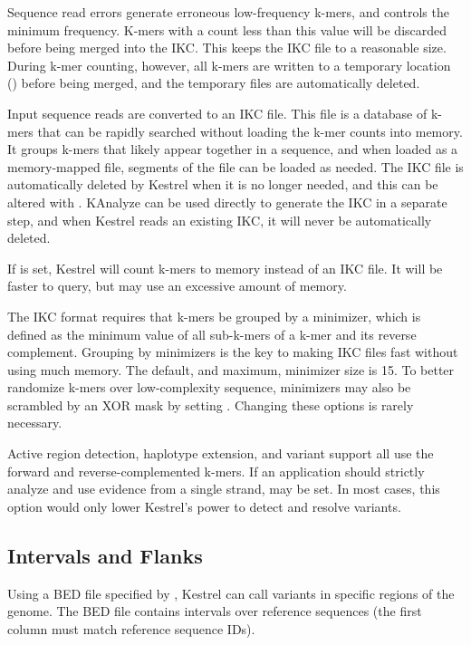 Sequence read errors generate erroneous low-frequency k-mers, and  controls the minimum frequency. K-mers with a count less than this value will be discarded before being merged into the IKC. This keeps the IKC file to a reasonable size. During k-mer counting, however, all k-mers are written to a temporary location () before being merged, and the temporary files are automatically deleted.

Input sequence reads are converted to an IKC file. This file is a database of k-mers that can be rapidly searched without loading the k-mer counts into memory. It groups k-mers that likely appear together in a sequence, and when loaded as a memory-mapped file, segments of the file can be loaded as needed. The IKC file is automatically deleted by Kestrel when it is no longer needed, and this can be altered with . KAnalyze can be used directly to generate the IKC in a separate step, and when Kestrel reads an existing IKC, it will never be automatically deleted.

If  is set, Kestrel will count k-mers to memory instead of an IKC file. It will be faster to query, but may use an excessive amount of memory.

The IKC format requires that k-mers be grouped by a minimizer, which is defined as the minimum value of all sub-k-mers of a k-mer and its reverse complement. Grouping by minimizers is the key to making IKC files fast without using much memory. The default, and maximum, minimizer size is 15. To better randomize k-mers over low-complexity sequence, minimizers may also be scrambled by an XOR mask by setting . Changing these options is rarely necessary.

Active region detection, haplotype extension, and variant support all use the forward and reverse-complemented k-mers. If an application should strictly analyze and use evidence from a single strand,  may be set. In most cases, this option would only lower Kestrel's power to detect and resolve variants.

\subsection{Intervals and Flanks}
\label{sec.process.intervals}

Using a BED file specified by , Kestrel can call variants in specific regions of the genome. The BED file contains intervals over reference sequences (the first column must match reference sequence IDs).

